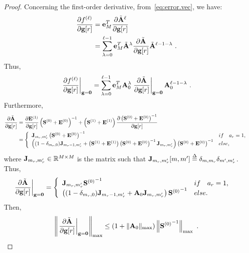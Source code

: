 \documentclass[journal,onecolumn]{IEEEtran}
\begin{document}
\begin{proof}
Concerning the first-order derivative, from~\eqref{eq:error.vec}, we have:
\begin{align*}
\dfrac{\partial f^{(\ell)}}{\partial {\mathbf g}[r]} &= {\mathbf e}_M^T\dfrac{\partial \tilde{{\mathbf A}}^{\ell}}{\partial {\mathbf g}[r]} \\
&= \sum_{\lambda=0}^{\ell-1} {\mathbf e}_M^T\tilde{{\mathbf A}}^\lambda\dfrac{\partial \tilde{{\mathbf A}}}{\partial {\mathbf g}[r]}\tilde{{\mathbf A}}^{\ell-1-\lambda}\ .
\end{align*}
Thus,
\begin{equation}
\left.\dfrac{\partial f^{(\ell)}}{\partial \bg[r]}\right|_{\bg=\bzero} = \sum_{\lambda=0}^{\ell-1} \be_M^T\bA_0^\lambda\left.\dfrac{\partial \tilde\bA}{\partial \bg[r]}\right|_{\bg=\bzero}\bA_0^{\ell-1-\lambda}\ .
\label{eq:df}
\end{equation}
Furthermore,
\begin{align*}
\dfrac{\partial \tilde{{\mathbf A}}}{\partial {\mathbf g}[r]} &= \dfrac{\partial {\mathbf E}^{(1)}}{\partial {\mathbf g}[r]}\left( {\mathbf S}^{(0)}+{\mathbf E}^{(0)}\right)^{-1} +  \left({\mathbf S}^{(1)}+{\mathbf E}^{(1)}\right)\dfrac{\partial \left( {\mathbf S}^{(0)}+{\mathbf E}^{(0)}\right)^{-1}}{\partial {\mathbf g}[r]} \\
&= \left\{
\begin{array}{ll}
{\mathbf J}_{m_r,m'_r}\left( {\mathbf S}^{(0)}+{\mathbf E}^{(0)}\right)^{-1} & \relax{if}\quad a_r=1, \\
\left( (1-\delta_{m_r,0}){\mathbf J}_{m_r-1,m'_r} +\left({\mathbf S}^{(1)}+{\mathbf E}^{(1)}\right)\left( {\mathbf S}^{(0)}+{\mathbf E}^{(0)}\right)^{-1}{\mathbf J}_{m_r,m'_r} \right) \left( {\mathbf S}^{(0)}+{\mathbf E}^{(0)}\right)^{-1} & \relax{else,}
\end{array}
\right.
\end{align*}
where ${\mathbf J}_{m_r,m'_r}\in{\mathbb R}^{M\times M}$ is the matrix such that ${\mathbf J}_{m_r,m'_r}[m,m'] \overset{\Delta}{=} \delta_{m,m_r}\delta_{m',m'_r}$.
Thus,
\begin{align*}
\left.\dfrac{\partial \tilde{{\mathbf A}}}{\partial {\mathbf g}[r]}\right|_{{\mathbf g}=\boldsymbol{0}} &= \left\{
\begin{array}{ll}
{\mathbf J}_{m_r,m'_r}{{\mathbf S}^{(0)}}^{-1} & \relax{if}\quad a_r=1, \\
\left((1-\delta_{m_r,0}){\mathbf J}_{m_r-1,m'_r} +{\mathbf A}_0{\mathbf J}_{m_r,m'_r}\right){{\mathbf S}^{(0)}}^{-1} & \relax{else.}
\end{array}
\right.
\end{align*}
Then,
\begin{equation*}
\left\| \left.\dfrac{\partial \tilde\bA}{\partial \bg[r]}\right|_{\bg=\bzero}\right\|_{\max} \leq \left(1+\|\bA_0\|_{\max}\right)\left\|{\bS^{(0)}}^{-1}\right\|_{\max}\ .
\end{equation*}

\end{proof}
\end{document}
